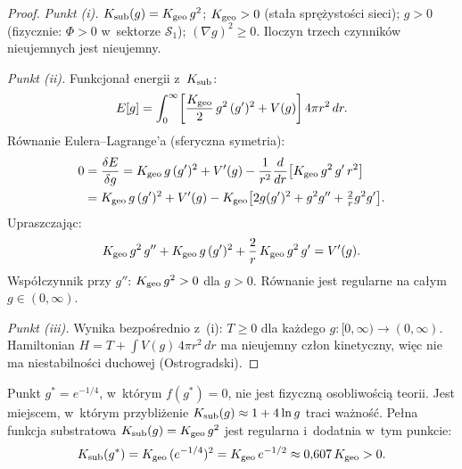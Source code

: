 \begin{proof}
\emph{Punkt (i).}
$K_{\rm sub}(g) = K_{\rm geo}\,g^2$; $K_{\rm geo} > 0$
(stała sprężystości sieci); $g > 0$ (fizycznie: $\Phi > 0$
w~sektorze $\mathcal{S}_1$); $(\nabla g)^2 \geq 0$.
Iloczyn trzech czynników nieujemnych jest nieujemny.

\medskip
\emph{Punkt (ii).}
Funkcjonał energii z~$K_{\rm sub}$:
\begin{equation}
  E[g] = \int_0^\infty\!
    \left[\frac{K_{\rm geo}}{2}\,g^2\,(g')^2 + V(g)\right]
    4\pi r^2\,dr.
\end{equation}
Równanie Eulera--Lagrange'a (sferyczna symetria):
\begin{align}
  0 &= \frac{\delta E}{\delta g}
     = K_{\rm geo}\,g\,(g')^2 + V'(g)
     - \frac{1}{r^2}\frac{d}{dr}\!\left[K_{\rm geo}\,g^2\,g'\,r^2\right] \\
    &= K_{\rm geo}\,g\,(g')^2 + V'(g)
     - K_{\rm geo}\bigl[2g(g')^2 + g^2 g'' + \tfrac{2}{r}g^2 g'\bigr].
\end{align}
Upraszczając:
\[
  K_{\rm geo}\,g^2\,g''
  + K_{\rm geo}\,g\,(g')^2
  + \frac{2}{r}\,K_{\rm geo}\,g^2\,g'
  = V'(g).
\]
Współczynnik przy $g''$: $K_{\rm geo}\,g^2 > 0$ dla $g > 0$.
Równanie jest regularne na całym $g \in (0,\infty)$.

\medskip
\emph{Punkt (iii).}
Wynika bezpośrednio z~(i): $T \geq 0$ dla każdego
$g : [0,\infty) \to (0,\infty)$.
Hamiltonian $H = T + \int V(g)\,4\pi r^2\,dr$
ma nieujemny człon kinetyczny, więc nie ma niestabilności
duchowej (Ostrogradski).
\end{proof}

\begin{corollary}[Osobliwość $f(g^*) = 0$ jest artefaktem]\label{cor:ghost-artifact}
Punkt $g^* = e^{-1/4}$, w~którym $f(g^*) = 0$,
nie jest fizyczną osobliwością teorii.
Jest miejscem, w~którym przybliżenie
$K_{\rm sub}(g) \approx 1 + 4\ln g$ traci ważność.
Pełna funkcja substratowa $K_{\rm sub}(g) = K_{\rm geo}\,g^2$
jest regularna i~dodatnia w~tym punkcie:
\begin{equation}
  K_{\rm sub}(g^*) = K_{\rm geo}\,(e^{-1/4})^2
  = K_{\rm geo}\,e^{-1/2} \approx 0{,}607\,K_{\rm geo} > 0.
\end{equation}
\end{corollary}

